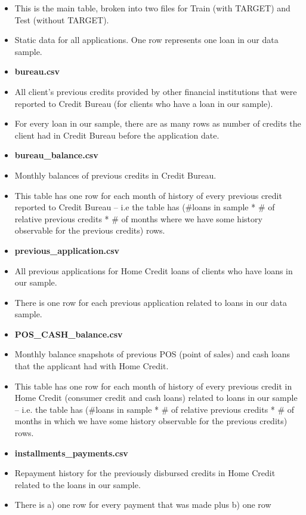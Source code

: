 \documentclass[11pt]{article}
\begin{document}
\begin{itemize}
\item
  This is the main table, broken into two files for Train (with TARGET)
  and Test (without TARGET).
\item
  Static data for all applications. One row represents one loan in our
  data sample.
\item
  \textbf{bureau.csv}
\item
  All client's previous credits provided by other financial institutions
  that were reported to Credit Bureau (for clients who have a loan in
  our sample).
\item
  For every loan in our sample, there are as many rows as number of
  credits the client had in Credit Bureau before the application date.
\item
  \textbf{bureau\_balance.csv}
\item
  Monthly balances of previous credits in Credit Bureau.
\item
  This table has one row for each month of history of every previous
  credit reported to Credit Bureau -- i.e the table has (\#loans in
  sample * \# of relative previous credits * \# of months where we have
  some history observable for the previous credits) rows.
\item
  \textbf{previous\_application.csv}
\item
  All previous applications for Home Credit loans of clients who have
  loans in our sample.
\item
  There is one row for each previous application related to loans in our
  data sample.
\item
  \textbf{POS\_CASH\_balance.csv}
\item
  Monthly balance snapshots of previous POS (point of sales) and cash
  loans that the applicant had with Home Credit.
\item
  This table has one row for each month of history of every previous
  credit in Home Credit (consumer credit and cash loans) related to
  loans in our sample -- i.e. the table has (\#loans in sample * \# of
  relative previous credits * \# of months in which we have some history
  observable for the previous credits) rows.
\item
  \textbf{installments\_payments.csv}
\item
  Repayment history for the previously disbursed credits in Home Credit
  related to the loans in our sample.
\item
  There is a) one row for every payment that was made plus b) one row

\end{itemize}
\end{document}
